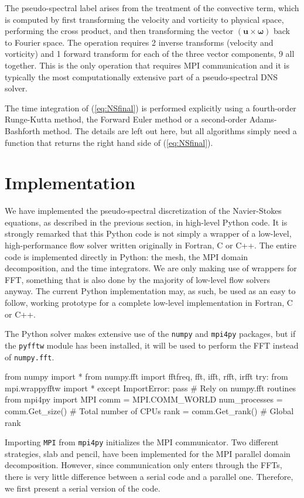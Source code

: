 \documentclass[11pt, oneside]{article}
\begin{document}
The pseudo-spectral label arises from the treatment of the convective term, which is computed by first transforming the velocity and vorticity to physical space, performing the cross product, and then transforming the vector ${(\bm{u}  \times  \bm{\omega})}$  back to Fourier space. The operation requires 2 inverse transforms (velocity and vorticity) and 1 forward transform for each of the three vector components, 9 all together. This is the only operation that requires MPI communication and it is typically the most computationally extensive part of a pseudo-spectral DNS solver.

The time integration of (\ref{eq:NSfinal}) is performed explicitly using a fourth-order Runge-Kutta method, the Forward Euler method or a second-order Adams-Bashforth method. The details are left out here, but all algorithms simply need a function that returns the right hand side of (\ref{eq:NSfinal}).

\section{Implementation}

We have implemented the pseudo-spectral discretization of the Navier-Stokes equations, as described in the previous section, in high-level Python code. It is strongly remarked that this Python code is not simply a wrapper of a low-level, high-performance flow solver written originally in Fortran, C or C++. The entire code is implemented directly in Python: the mesh, the MPI domain decomposition, and the time integrators. We are only making use of wrappers for FFT, something that is also done by the majority of low-level flow solvers anyway. The current Python implementation may, as such, be used as an easy to follow, working prototype for a complete low-level implementation in Fortran, C or C++.

The Python solver makes extensive use of the \texttt{numpy} and \texttt{mpi4py} packages, but if the \texttt{pyfftw} module has been installed, it will be used to perform the FFT instead of \texttt{numpy.fft}.

\begin{python}
from numpy import *
from numpy.fft import fftfreq, fft, ifft, rfft, irfft
try:
    from mpi.wrappyfftw import *
except ImportError:
    pass # Rely on numpy.fft routines
from mpi4py import MPI
comm = MPI.COMM_WORLD
num_processes = comm.Get_size() # Total number of CPUs
rank = comm.Get_rank()          # Global rank
\end{python}
Importing \texttt{MPI} from \texttt{mpi4py} initializes the MPI communicator. Two different strategies, slab and pencil, have been implemented for the MPI parallel domain decomposition. However, since communication only enters through the FFTs, there is very little difference between a serial code and a parallel one. Therefore, we first present a serial version of the code.
\end{document}
